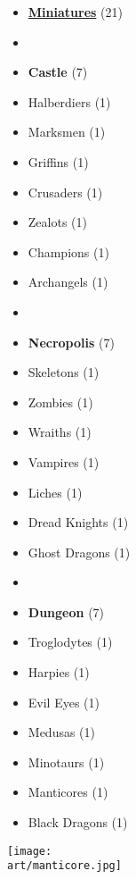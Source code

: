 
\begin{multicols*}{2}

\footnotesize

\begin{itemize}[leftmargin=0pt, label={}, noitemsep, noitemsep]
  \item \textbf{\small{\underline{Miniatures}}} (21)
  \item
  \item \textbf{Castle} (7)
  \item Halberdiers (1)
  \item Marksmen (1)
  \item Griffins (1)
  \item Crusaders (1)
  \item Zealots (1)
  \item Champions (1)
  \item Archangels (1)
  \item
  \item \textbf{Necropolis} (7)
  \item Skeletons (1)
  \item Zombies (1)
  \item Wraiths (1)
  \item Vampires (1)
  \item Liches (1)
  \item Dread Knights (1)
  \item Ghost Dragons (1)
  \item
  \item \textbf{Dungeon} (7)
  \item Troglodytes (1)
  \item Harpies (1)
  \item Evil Eyes (1)
  \item Medusas (1)
  \item Minotaurs (1)
  \item Manticores (1)
  \item Black Dragons (1)
\end{itemize}

\columnbreak

\hspace{-2.75em}
\texttt{[image: \\art/manticore.jpg]}

\end{multicols*}
